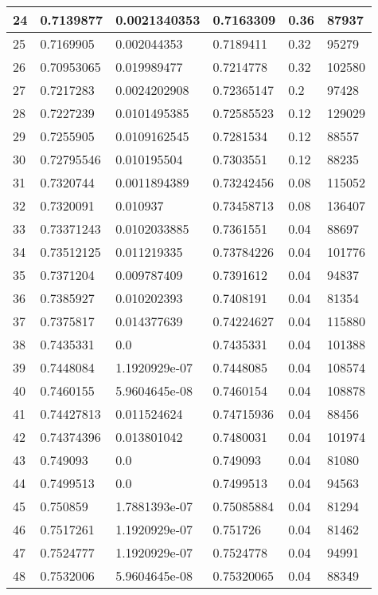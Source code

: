 \begin{longtable}{|l|l|l|l|l|l|}
24 & 0.7139877 & 0.0021340353 & 0.7163309 & 0.36 & 87937 \\ \hline 
25 & 0.7169905 & 0.002044353 & 0.7189411 & 0.32 & 95279 \\ \hline 
26 & 0.70953065 & 0.019989477 & 0.7214778 & 0.32 & 102580 \\ \hline 
27 & 0.7217283 & 0.0024202908 & 0.72365147 & 0.2 & 97428 \\ \hline 
28 & 0.7227239 & 0.0101495385 & 0.72585523 & 0.12 & 129029 \\ \hline 
29 & 0.7255905 & 0.0109162545 & 0.7281534 & 0.12 & 88557 \\ \hline 
30 & 0.72795546 & 0.010195504 & 0.7303551 & 0.12 & 88235 \\ \hline 
31 & 0.7320744 & 0.0011894389 & 0.73242456 & 0.08 & 115052 \\ \hline 
32 & 0.7320091 & 0.010937 & 0.73458713 & 0.08 & 136407 \\ \hline 
33 & 0.73371243 & 0.0102033885 & 0.7361551 & 0.04 & 88697 \\ \hline 
34 & 0.73512125 & 0.011219335 & 0.73784226 & 0.04 & 101776 \\ \hline 
35 & 0.7371204 & 0.009787409 & 0.7391612 & 0.04 & 94837 \\ \hline 
36 & 0.7385927 & 0.010202393 & 0.7408191 & 0.04 & 81354 \\ \hline 
37 & 0.7375817 & 0.014377639 & 0.74224627 & 0.04 & 115880 \\ \hline 
38 & 0.7435331 & 0.0 & 0.7435331 & 0.04 & 101388 \\ \hline 
39 & 0.7448084 & 1.1920929e-07 & 0.7448085 & 0.04 & 108574 \\ \hline 
40 & 0.7460155 & 5.9604645e-08 & 0.7460154 & 0.04 & 108878 \\ \hline 
41 & 0.74427813 & 0.011524624 & 0.74715936 & 0.04 & 88456 \\ \hline 
42 & 0.74374396 & 0.013801042 & 0.7480031 & 0.04 & 101974 \\ \hline 
43 & 0.749093 & 0.0 & 0.749093 & 0.04 & 81080 \\ \hline 
44 & 0.7499513 & 0.0 & 0.7499513 & 0.04 & 94563 \\ \hline 
45 & 0.750859 & 1.7881393e-07 & 0.75085884 & 0.04 & 81294 \\ \hline 
46 & 0.7517261 & 1.1920929e-07 & 0.751726 & 0.04 & 81462 \\ \hline 
47 & 0.7524777 & 1.1920929e-07 & 0.7524778 & 0.04 & 94991 \\ \hline 
48 & 0.7532006 & 5.9604645e-08 & 0.75320065 & 0.04 & 88349 \\ \hline 

\end{longtable}
